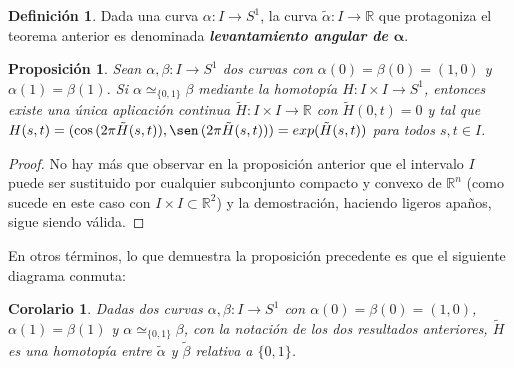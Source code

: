 \documentclass[11pt]{report}
\newtheorem{proposition}{Proposición}[chapter]
\newtheorem{corollary}{Corolario}[chapter]
\theoremstyle{definition}
\newtheorem{definition}{Definición}[chapter]
\theoremstyle{definition}
\theoremstyle{remark}
\newcommand{\R}{\mathbb R}
\begin{document}
\begin{definition}
Dada una curva $\alpha \colon I \to S^1$, la curva $\tilde{\alpha} \colon I \to \R$ que protagoniza el teorema anterior es denominada \textbf{\textit{levantamiento angular de $\bm{\alpha}$}}.
\end{definition}

\begin{proposition}
Sean $\alpha,\beta \colon I \to S^1$ dos curvas con $\alpha(0)=\beta(0)=(1,0)$ y $\alpha(1)=\beta(1)$. Si $\alpha \simeq_{\{0,1\}} \beta$ mediante la homotopía $H \colon I \times I \to S^1$, entonces existe una única aplicación continua $\tilde{H} \colon I \times I \to \R$ con $\tilde{H}(0,t) = 0$ y tal que $H(s,t) = (\cos \, (2\pi \tilde{H}(s,t)),\sen \, (2\pi \tilde{H}(s,t))) = exp(\tilde{H}(s,t))$ para todos $s, t \in I$.
\end{proposition}

\begin{proof}
No hay más que observar en la proposición anterior que el intervalo $I$ puede ser sustituido por cualquier subconjunto compacto y convexo de $\R^n$ (como sucede en este caso con $I \times I \subset \R^2$) y la demostración, haciendo ligeros apaños, sigue siendo válida.
\end{proof}

En otros términos, lo que demuestra la proposición precedente es que el siguiente diagrama conmuta:
\begin{center}
\end{center}

\begin{corollary}
Dadas dos curvas $\alpha,\beta \colon I \to S^1$ con $\alpha(0) = \beta(0) = (1,0)$, $\alpha(1) = \beta(1)$ y $\alpha \simeq_{\{0,1\}} \beta$, con la notación de los dos resultados anteriores, $\tilde{H}$ es una homotopía entre $\tilde{\alpha}$ y $\tilde{\beta}$ relativa a $\{0,1\}$.
\end{corollary}
\end{document}

